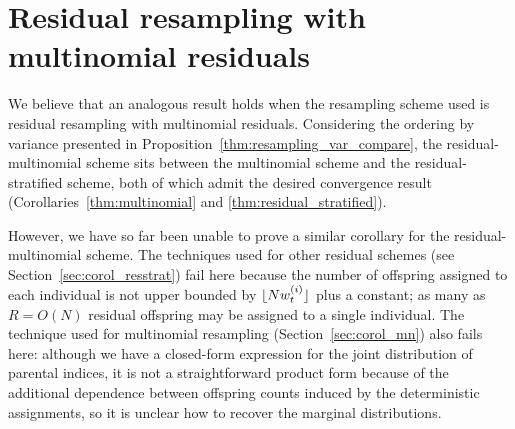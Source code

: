\section{Residual resampling with multinomial residuals}
We believe that an analogous result holds when the resampling scheme used is residual resampling with multinomial residuals. Considering the ordering by variance presented in Proposition~\ref{thm:resampling_var_compare}, the residual-multinomial scheme sits between the multinomial scheme and the residual-stratified scheme, both of which admit the desired convergence result (Corollaries~\ref{thm:multinomial} and \ref{thm:residual_stratified}).

However, we have so far been unable to prove a similar corollary for the residual-multinomial scheme.
The techniques used for other residual schemes (see Section~\ref{sec:corol_resstrat}) fail here because the number of offspring assigned to each individual is not upper bounded by $\lfloor N w_t^{(i)} \rfloor$ plus a constant; as many as $R = O(N)$ residual offspring may be assigned to a single individual.
The technique used for multinomial resampling (Section~\ref{sec:corol_mn}) also fails here: although we have a closed-form expression for the joint distribution of parental indices, it is not a straightforward product form because of the additional dependence between offspring counts induced by the deterministic assignments, so it is unclear how to recover the marginal distributions.
%
%
